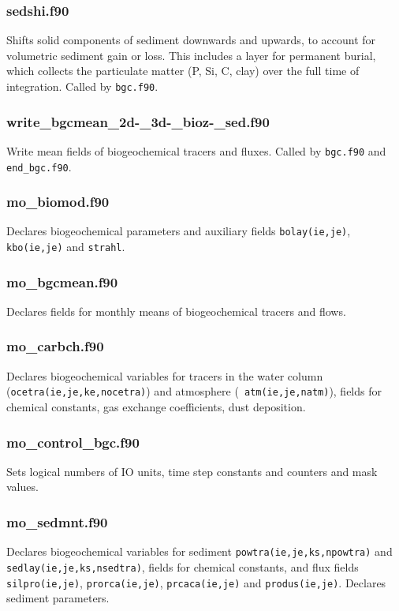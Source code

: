 \documentclass[11pt,a4paper,fleqn,twoside]{article}
\begin{document}
\subsubsection{sedshi.f90} Shifts solid components of sediment downwards and
upwards, to account for volumetric sediment gain or loss. This includes a layer
for permanent burial, which collects the particulate matter (P, Si, C, clay)
over the full time of integration. Called by {\tt bgc.f90}. 


\subsubsection{write\_bgcmean\_2d-\_3d-\_bioz-\_sed.f90} Write mean fields of
biogeochemical tracers and fluxes. Called by {\tt bgc.f90} and {\tt end\_bgc.f90}.

\subsubsection{mo\_biomod.f90} Declares biogeochemical parameters and auxiliary
fields {\tt bolay(ie,je)}, {\tt kbo(ie,je)} and {\tt strahl}.

\subsubsection{mo\_bgcmean.f90} Declares fields for monthly means of
biogeochemical tracers and flows.

\subsubsection{mo\_carbch.f90} Declares biogeochemical variables for tracers
in the water column ({\tt ocetra(ie,je,ke,nocetra)}) and atmosphere ({\tt
atm(ie,je,natm)}), fields for chemical constants, gas exchange coefficients,
dust deposition.

\subsubsection{mo\_control\_bgc.f90} Sets logical numbers of IO units, time
step constants and counters and mask values.

\subsubsection{mo\_sedmnt.f90} Declares biogeochemical variables for sediment
{\tt powtra(ie,je,ks,npowtra)} and \\
{\tt sedlay(ie,je,ks,nsedtra)}, fields for
chemical constants, and flux fields {\tt silpro(ie,je)}, {\tt prorca(ie,je)},
{\tt prcaca(ie,je)} and {\tt produs(ie,je)}. Declares sediment parameters.
\end{document}
